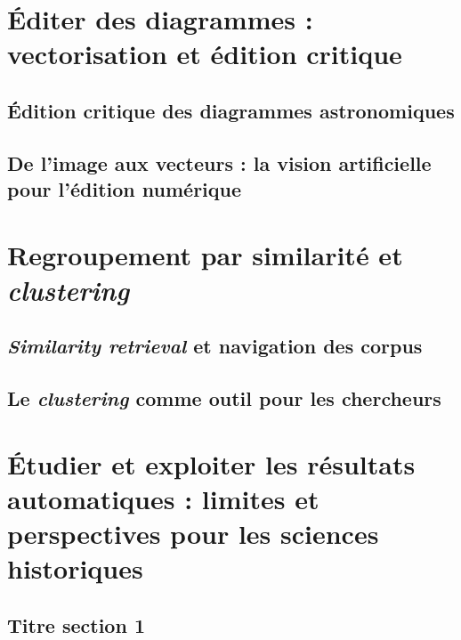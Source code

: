 \documentclass[a4paper,12pt,twoside]{book}
\newcommand{\clearemptydoublepage}{\newpage{\pagestyle{empty}\cleardoublepage}}
\begin{document}
        \chapter[Éditer des diagrammes]{Éditer des diagrammes : vectorisation et édition critique}
                \section{Édition critique des diagrammes astronomiques}
                    
            
                \section[De l’image aux vecteurs]{De l’image aux vecteurs : la vision artificielle pour l’édition numérique}
                    
            
        \clearemptydoublepage
        
        \chapter{Regroupement par similarité et \textit{clustering}}
                \section{\textit{Similarity retrieval} et navigation des corpus}
                    
            
                \section{Le \textit{clustering} comme outil pour les chercheurs}
                    
            
        \clearemptydoublepage
        
        \chapter[Exploiter les résultats automatique]{Étudier et exploiter les résultats automatiques : limites et perspectives pour les sciences historiques}
                \section{Titre section 1}
                    
            
\end{document}
